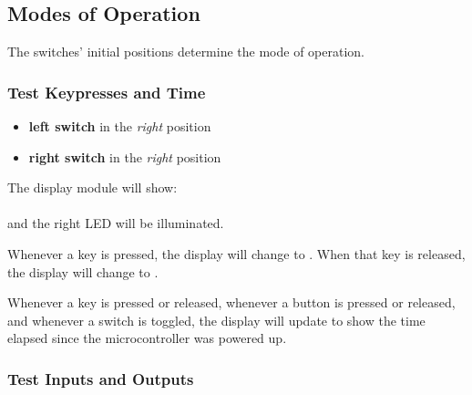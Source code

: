 \subsection{Modes of Operation}

The switches' initial positions determine the mode of operation.

\subsubsection*{Test Keypresses and Time}

\begin{itemize}
    \item \textbf{left switch} in the \textit{right} position
    \item \textbf{right switch} in the \textit{right} position
\end{itemize}

\begin{description}
\end{description}
The display module will show: \\
 \\
and the right LED will be illuminated.

Whenever a key is pressed, the display will change  to .
When that key is released, the display will change  to .

Whenever a key is pressed or released, whenever a button is pressed or released, and whenever a switch is toggled,
the display will update to show the time elapsed since the microcontroller was powered up.

\subsubsection*{Test Inputs and Outputs}

